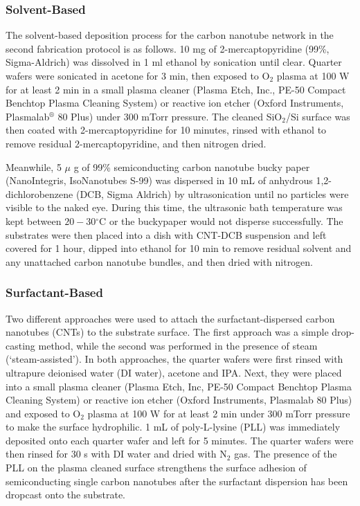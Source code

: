 \documentclass[
  a4paper,
]{scrbook}
\begin{document}
\hypertarget{solvent-based}{%
\subsubsection*{Solvent-Based}\label{solvent-based}}

The solvent-based deposition process for the carbon nanotube network in
the second fabrication protocol is as follows. 10 mg of
2-mercaptopyridine (99\%, Sigma-Aldrich) was dissolved in 1 ml ethanol
by sonication until clear. Quarter wafers were sonicated in acetone for
3 min, then exposed to O\(_2\) plasma at 100 W for at least 2 min in a
small plasma cleaner (Plasma Etch, Inc., PE-50 Compact Benchtop Plasma
Cleaning System) or reactive ion etcher (Oxford Instruments,
Plasmalab\(^\circledR\) 80 Plus) under 300 mTorr pressure. The cleaned
SiO\(_2\)/Si surface was then coated with 2-mercaptopyridine for 10
minutes, rinsed with ethanol to remove residual \(2\)-mercaptopyridine,
and then nitrogen dried.

Meanwhile, 5 \(\mu\) g of 99\% semiconducting carbon nanotube bucky
paper (NanoIntegris, IsoNanotubes S-99) was dispersed in 10 mL of
anhydrous 1,2-dichlorobenzene (DCB, Sigma Aldrich) by ultrasonication
until no particles were visible to the naked eye. During this time, the
ultrasonic bath temperature was kept between \(20-30\)\(^\circ\)C or the
buckypaper would not disperse successfully. The substrates were then
placed into a dish with CNT-DCB suspension and left covered for 1 hour,
dipped into ethanol for 10 min to remove residual solvent and any
unattached carbon nanotube bundles, and then dried with nitrogen.

\hypertarget{surfactant-based}{%
\subsubsection*{Surfactant-Based}\label{surfactant-based}}

Two different approaches were used to attach the surfactant-dispersed
carbon nanotubes (CNTs) to the substrate surface. The first approach was
a simple drop-casting method, while the second was performed in the
presence of steam (`steam-assisted'). In both approaches, the quarter
wafers were first rinsed with ultrapure deionised water (DI water),
acetone and IPA. Next, they were placed into a small plasma cleaner
(Plasma Etch, Inc, PE-50 Compact Benchtop Plasma Cleaning System) or
reactive ion etcher (Oxford Instruments, Plasmalab 80 Plus) and exposed
to O\(_2\) plasma at 100 W for at least 2 min under 300 mTorr pressure
to make the surface hydrophilic. 1 mL of poly-L-lysine (PLL) was
immediately deposited onto each quarter wafer and left for 5 minutes.
The quarter wafers were then rinsed for 30 s with DI water and dried
with N\(_2\) gas. The presence of the PLL on the plasma cleaned surface
strengthens the surface adhesion of semiconducting single carbon
nanotubes after the surfactant dispersion has been dropcast onto the
substrate.
\end{document}
